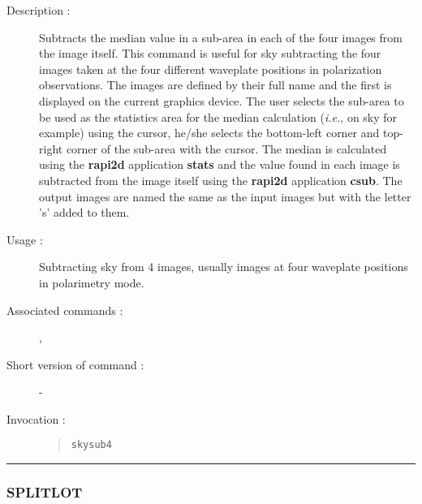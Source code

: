 \begin{description}

\item[Description :] Subtracts the median value in a sub-area in each
of the four images from the image itself.  This command is useful for
sky subtracting the four images taken at the four different waveplate
positions in polarization observations.  The images are defined by
their full name and the first is displayed on the current graphics
device.  The user selects the sub-area to be used as the statistics
area for the median calculation (\emph{i.e.}, on sky for example) using
the cursor, he/she selects the bottom-left corner and top-right corner
of the sub-area with the cursor.  The median is calculated using the
{\bf rapi2d} application {\bf stats} and the value found in each image is
subtracted from the image itself using the {\bf rapi2d} application
{\bf csub}.  The output images are named the same as the input images but
with the letter 's' added to them.

\item[Usage :] Subtracting sky from 4 images, usually images at four
waveplate positions in polarimetry mode.

\item[Associated commands :] {\tt {}}, 
{\tt {}}

\item[Short version of command :] -
\item[Invocation :]

\begin{quote}{\tt  skysub4 }\end{quote}

\end{description}

\hrule 
\subsubsection*{\label{SPLITLOT}SPLITLOT}

